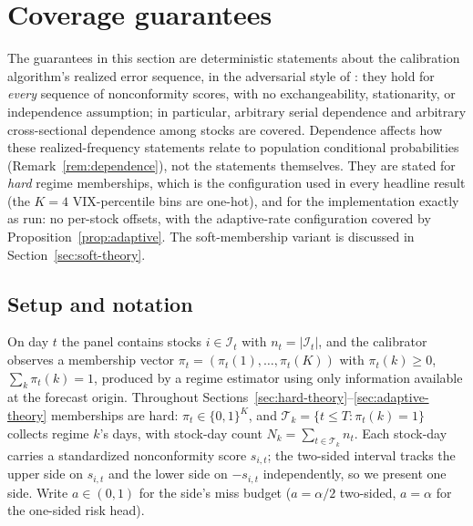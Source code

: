 
\section{Coverage guarantees}\label{sec:theory}

The guarantees in this section are deterministic statements about the
calibration algorithm's realized error sequence, in the adversarial style of
\citet{gibbs2021adaptive}: they hold for \emph{every} sequence of
nonconformity scores, with no exchangeability, stationarity, or independence
assumption; in particular, arbitrary serial dependence and arbitrary
cross-sectional dependence among stocks are covered. Dependence affects how
these realized-frequency statements relate to population conditional
probabilities (Remark~\ref{rem:dependence}), not the statements themselves.
They are stated for \emph{hard} regime memberships, which is the
configuration used in every headline result (the $K = 4$ VIX-percentile
bins are one-hot), and for the implementation exactly as run: no per-stock
offsets, with the adaptive-rate configuration covered by
Proposition~\ref{prop:adaptive}. The soft-membership variant is discussed
in Section~\ref{sec:soft-theory}.

\subsection{Setup and notation}

On day $t$ the panel contains stocks $i \in \mathcal{I}_t$ with
$n_t = |\mathcal{I}_t|$, and the calibrator observes a membership vector
$\pi_t = (\pi_t(1), \dots, \pi_t(K))$ with $\pi_t(k) \ge 0$,
$\sum_k \pi_t(k) = 1$, produced by a regime estimator using only
information available at the forecast origin. Throughout
Sections~\ref{sec:hard-theory}--\ref{sec:adaptive-theory} memberships are
hard: $\pi_t \in \{0, 1\}^K$, and $\mathcal{T}_k = \{ t \le T : \pi_t(k) =
1 \}$ collects regime $k$'s days, with stock-day count
$N_k = \sum_{t \in \mathcal{T}_k} n_t$. Each stock-day carries a
standardized nonconformity score $s_{i,t}$; the two-sided interval tracks
the upper side on $s_{i,t}$ and the lower side on $-s_{i,t}$
independently, so we present one side. Write $a \in (0,1)$ for the side's
miss budget ($a = \alpha/2$ two-sided, $a = \alpha$ for the one-sided risk
head).

